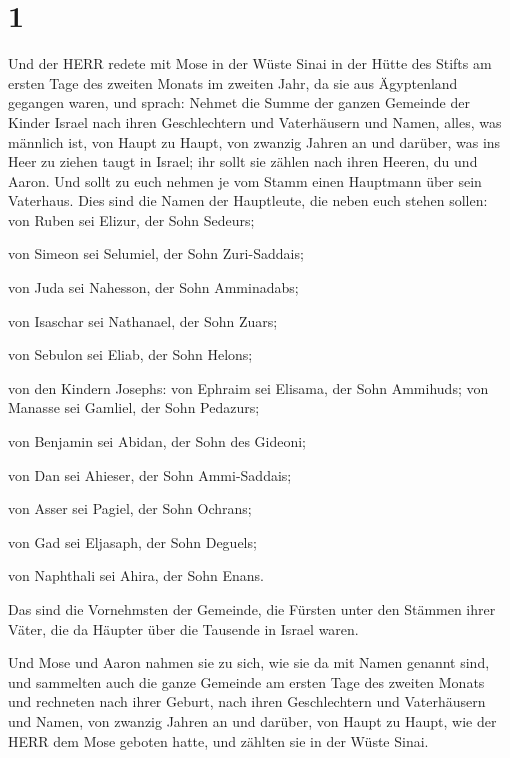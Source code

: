 \hypertarget{section}{%
\section{1}\label{section}}

 Und der HERR redete mit Mose in der Wüste Sinai in der
Hütte des Stifts am ersten Tage des zweiten Monats im zweiten Jahr, da
sie aus Ägyptenland gegangen waren, und sprach:  Nehmet die
Summe der ganzen Gemeinde der Kinder Israel nach ihren Geschlechtern und
Vaterhäusern und Namen, alles, was männlich ist, von Haupt zu Haupt,
 von zwanzig Jahren an und darüber, was ins Heer zu ziehen
taugt in Israel; ihr sollt sie zählen nach ihren Heeren, du und Aaron.
 Und sollt zu euch nehmen je vom Stamm einen Hauptmann über
sein Vaterhaus.  Dies sind die Namen der Hauptleute, die
neben euch stehen sollen: von Ruben sei Elizur, der Sohn Sedeurs;

 von Simeon sei Selumiel, der Sohn Zuri-Saddais;

 von Juda sei Nahesson, der Sohn Amminadabs;

 von Isaschar sei Nathanael, der Sohn Zuars;

 von Sebulon sei Eliab, der Sohn Helons;

 von den Kindern Josephs: von Ephraim sei Elisama, der Sohn
Ammihuds; von Manasse sei Gamliel, der Sohn Pedazurs;

 von Benjamin sei Abidan, der Sohn des Gideoni;

 von Dan sei Ahieser, der Sohn Ammi-Saddais;

 von Asser sei Pagiel, der Sohn Ochrans;

 von Gad sei Eljasaph, der Sohn Deguels;

 von Naphthali sei Ahira, der Sohn Enans.

 Das sind die Vornehmsten der Gemeinde, die Fürsten unter
den Stämmen ihrer Väter, die da Häupter über die Tausende in Israel
waren.

 Und Mose und Aaron nahmen sie zu sich, wie sie da mit
Namen genannt sind,  und sammelten auch die ganze Gemeinde
am ersten Tage des zweiten Monats und rechneten nach ihrer Geburt, nach
ihren Geschlechtern und Vaterhäusern und Namen, von zwanzig Jahren an
und darüber, von Haupt zu Haupt,  wie der HERR dem Mose
geboten hatte, und zählten sie in der Wüste Sinai.

